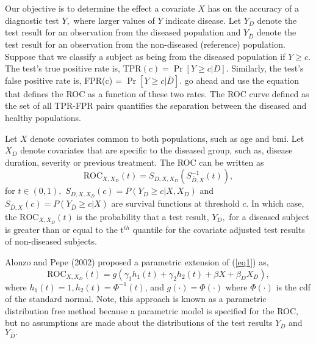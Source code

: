 \documentclass{interact}
\theoremstyle{definition}
\newcommand{\ROC}{\text{ROC}}
\begin{document}
Our objective is to determine the effect  a covariate  $X$ has on the accuracy of a diagnostic test $Y,$ where larger values of $Y$ indicate disease.  Let $Y_D$ denote the test result for an observation from the  diseased population and $Y_{\bar{D}}$ denote the test result for an observation from  the non-diseased (reference) population.  Suppose that we classify a subject as being from the diseased population  
if $Y \geq c.$ 
The  test's 
true positive rate is, TPR$(c) = \Pr[Y \geq c|D].$ Similarly, the test's 
 false positive rate is, FPR(c) = $\Pr[Y \geq c | \bar{D}].$  {\color{blue} go ahead and use the equation that defines the ROC as a function of these two rates. The ROC curve defined as the set of all TPR-FPR pairs quantifies the separation between the diseased and healthy populations.}

Let  $X$ denote covariates common to both populations, such as age and bmi. Let $X_D$ denote covariates that are specific to the diseased group, such as, disease duration, severity or previous treatment.
The ROC  can be written as 
\begin{equation}\label{roc} \ROC_{X, X_D}(t) = S_{D,X,X_D}(S^{-1}_{\bar{D}, X}(t)),\end{equation}
 for $t \in (0,1),$
 $S_{D,X,X_D}(c) = P(Y_D \geq c|X, X_D)$ and $S_{\bar{D}, X}(c) = P(Y_{\bar{D}} \geq c|X)$ are survival functions at threshold $c.$ In which case, the  $\ROC_{X, X_D}(t)$ is the probability that a test result, $Y_D,$ for a diseased subject is greater than or equal to the t$^{th}$ quantile 
 for the covariate adjusted test results of non-diseased subjects. 

Alonzo and Pepe (2002) proposed a  parametric extension of (\ref{eq1}) as, 
\begin{equation}\label{alonzo} \ROC_{X, X_D}(t) = g(  \gamma_1 h_1(t) + \gamma_2 h_2(t) + \beta X + \beta_D X_D),
\end{equation} where  $h_1(t) = 1, h_2(t) ={\Phi}^{-1}(t)$, and $g(\cdot) = {\Phi(\cdot)}$ where ${\Phi(\cdot)}$ is the cdf of the standard normal. Note,  this approach is known as a parametric distribution free method because a parametric model is specified for the ROC, but no assumptions are made about the distributions of the test results $Y_D$ and $Y_{\bar{D}}.$  %
\end{document}
